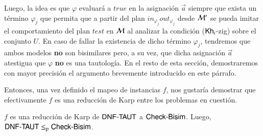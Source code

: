 Luego, la idea es que $\varphi$ evaluará a $true$ en la asignación $\overrightarrow{a}$ siempre que exista un término $\varphi_j$ que permita 
que a partir del plan $in_{\varphi_j}out_{\varphi_j}$ desde $\mathcal{M}'$ se pueda imitar el comportamiento del plan $test$ en $\mathcal{M}$ al 
analizar la condición ($\mathsf{Kh}_i$-zig) sobre el conjunto $U$. En caso de fallar la existencia de dicho término $\varphi_j$, tendremos que 
ambos modelos \textbf{no} son bisimilares pero, a su vez, que dicha asignación $\overrightarrow{a}$ atestigua que $\varphi$ \textbf{no} 
es una tautología. En el resto de esta sección, demostraremos con mayor precisión el argumento brevemente introducido en este párrafo.

Entonces, una vez definido el mapeo de instancias $f$, nos gustaría demostrar que efectivamente $f$ es una reducción de Karp entre los 
problemas en cuestión.

\begin{lema}\label{lema:dnf-leqp-cbisim}
    $f$ es una reducción de Karp de $\rm\textsf{DNF-TAUT}$ a $\rm\textsf{Check-Bisim}$. Luego, $\rm\textsf{DNF-TAUT} \leq_p \rm\textsf{Check-Bisim}$.
\end{lema}

